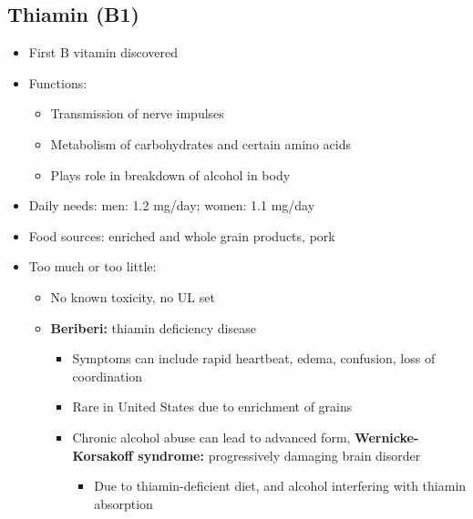 \documentclass[12pt]{article}
\begin{document}
        \subsection{Thiamin (B1)}
            \begin{itemize}
                \item First B vitamin discovered
                \item Functions:
                    \begin{itemize}
                        \item Transmission of nerve impulses
                        \item Metabolism of carbohydrates and certain amino acids
                        \item Plays role in breakdown of alcohol in body
                    \end{itemize}
                \item Daily needs: men: 1.2 mg/day; women: 1.1 mg/day
                \item Food sources: enriched and whole grain products, pork
                \item Too much or too little:
                    \begin{itemize}
                        \item No known toxicity, no UL set
                        \item \textbf{Beriberi:} thiamin deficiency disease
                            \begin{itemize}
                                \item Symptoms can include rapid heartbeat, edema, confusion, loss of coordination
                                \item Rare in United States due to enrichment of grains
                                \item Chronic alcohol abuse can lead to advanced form, \textbf{Wernicke-Korsakoff syndrome:} progressively damaging brain disorder
                                    \begin{itemize}
                                        \item Due to thiamin-deficient diet, and alcohol interfering with thiamin absorption
                                    \end{itemize}
                            \end{itemize}
                    \end{itemize}
            \end{itemize}
\end{document}
